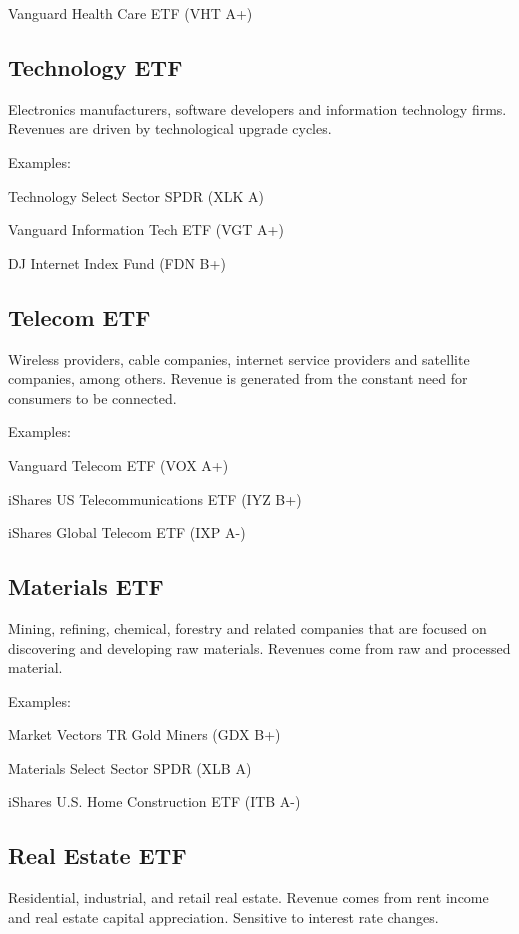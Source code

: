 \documentclass[11pt]{article}
\begin{document}
Vanguard Health Care ETF (VHT A+)


\subsection{Technology ETF}

Electronics manufacturers, software developers and information technology firms. Revenues are driven by technological upgrade cycles.


Examples:


Technology Select Sector SPDR (XLK A)


Vanguard Information Tech ETF (VGT A+)


DJ Internet Index Fund (FDN B+)


\subsection{Telecom ETF}

Wireless providers, cable companies, internet service providers and satellite companies, among others. Revenue is generated from the constant need for consumers to be connected.


Examples:


Vanguard Telecom ETF (VOX A+)


iShares US Telecommunications ETF (IYZ B+)


iShares Global Telecom ETF (IXP A-)


\subsection{Materials ETF}

Mining, refining, chemical, forestry and related companies that are focused on discovering and developing raw materials. Revenues come from raw and processed material.


Examples:


Market Vectors TR Gold Miners (GDX B+)


Materials Select Sector SPDR (XLB A)


iShares U.S. Home Construction ETF (ITB A-)


\subsection{Real Estate ETF}

Residential, industrial, and retail real estate. Revenue comes from rent income and real estate capital appreciation. Sensitive to interest rate changes.
\end{document}
